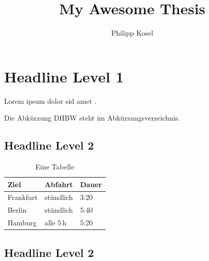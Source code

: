 \documentclass[
12pt,
BCOR=10mm,
a4paper,
bibliography=totoc,
includefoot,
listof=totoc,
smallheadings,
]{scrartcl}
\newcounter{savepage}
\begin{document}
\title{My Awesome Thesis}
\author{Philipp Kosel}

\maketitle
\newpage

\cleardoublepage
{}
\ohead[]{}

\lipsum[1]
\newpage

\lipsum[1]
\newpage

\tableofcontents
\newpage

\listoffigures
\newpage

\listoftables
\newpage

\printnomenclature
\newpage

\cleardoublepage
{}
\ohead[\headmark]{\headmark}

\section{Headline Level 1}
\lipsum[1-2]

Lorem ipsum dolor sid amet \autocite{mcconnell2004}.

Die Abkürzung DHBW steht im Abkürzungsverzeichnis.

\subsection{Headline Level 2}
\lipsum[1]

\begin{table}[htbp]
    \caption{Eine Tabelle}
    \label{tab:tabelle}
    \centering
    \begin{tabular}{lll}
        \toprule
        Ziel      & Abfahrt   & Dauer \\
        \midrule
        Frankfurt & stündlich & 3:20  \\
        Berlin    & stündlich & 5:40  \\
        Hamburg   & alle 5\,h & 5:20  \\
        \bottomrule
    \end{tabular}
\end{table}

\subsection{Headline Level 2}
\lipsum[1]
\end{document}
